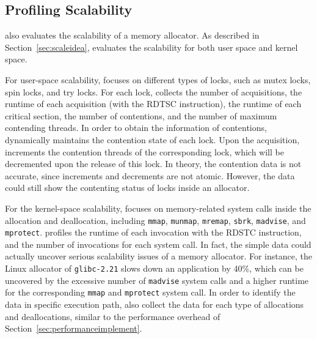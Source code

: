 
  
 

\subsection{Profiling Scalability}
\label{sec:profilingscale}

\MP{} also evaluates the scalability of a memory allocator. As described in Section~\ref{sec:scaleidea}, \MP{} evaluates the scalability for both user space and kernel space. 

For user-space scalability, \MP{} focuses on different types of locks, such as mutex locks, spin locks, and try locks. For each lock, \MP{} collects the number of acquisitions, the runtime of each acquisition (with the RDTSC instruction), the runtime of each critical section, the number of contentions, and the number of maximum contending threads. In order to obtain the information of contentions, \MP{} dynamically maintains the contention state of each lock. Upon the acquisition, \MP{} increments the contention threads of the corresponding lock, which will be decremented upon the release of this lock. In theory, the contention data is not accurate, since increments and decrements are not atomic. However,  the data could still show the contenting status of locks inside an allocator.    

For the kernel-space scalability, \MP{} focuses on memory-related system calls inside the allocation and deallocation, including \texttt{mmap}, \texttt{munmap}, \texttt{mremap}, \texttt{sbrk}, \texttt{madvise}, and \texttt{mprotect}. \MP{} profiles the runtime of each invocation with the RDSTC instruction, and the number of invocations for each system call. In fact, the simple data could actually uncover serious scalability issues of a memory allocator. For instance, the Linux allocator of \texttt{glibc-2.21} slows down an application by 40\%, which can be uncovered by the excessive number of \texttt{madvise} system calls and a higher runtime for the corresponding \texttt{mmap} and \texttt{mprotect} system call. In order to identify the data in specific execution path, \MP{} also collect the data for each type of allocations and deallocations, similar to the performance overhead of Section~\ref{sec:performanceimplement}.


